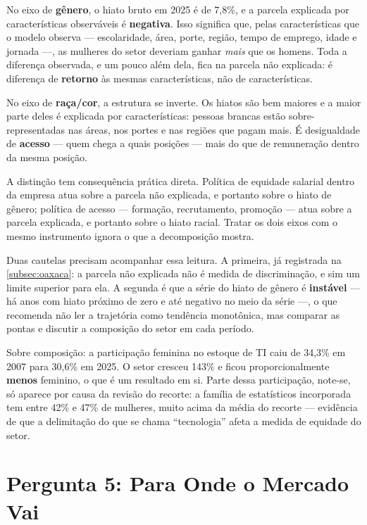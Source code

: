 No eixo de \textbf{gênero}, o hiato bruto em 2025 é de 7,8\%, e a parcela explicada por características observáveis é \textbf{negativa}. Isso significa que, pelas características que o modelo observa --- escolaridade, área, porte, região, tempo de emprego, idade e jornada ---, as mulheres do setor deveriam ganhar \textit{mais} que os homens. Toda a diferença observada, e um pouco além dela, fica na parcela não explicada: é diferença de \textbf{retorno} às mesmas características, não de características.

No eixo de \textbf{raça/cor}, a estrutura se inverte. Os hiatos são bem maiores e a maior parte deles é explicada por características: pessoas brancas estão sobre-representadas nas áreas, nos portes e nas regiões que pagam mais. É desigualdade de \textbf{acesso} --- quem chega a quais posições --- mais do que de remuneração dentro da mesma posição.

A distinção tem consequência prática direta. Política de equidade salarial dentro da empresa atua sobre a parcela não explicada, e portanto sobre o hiato de gênero; política de acesso --- formação, recrutamento, promoção --- atua sobre a parcela explicada, e portanto sobre o hiato racial. Tratar os dois eixos com o mesmo instrumento ignora o que a decomposição mostra.

Duas cautelas precisam acompanhar essa leitura. A primeira, já registrada na \autoref{subsec:oaxaca}: a parcela não explicada não é medida de discriminação, e sim um limite superior para ela. A segunda é que a série do hiato de gênero é \textbf{instável} --- há anos com hiato próximo de zero e até negativo no meio da série ---, o que recomenda não ler a trajetória como tendência monotônica, mas comparar as pontas e discutir a composição do setor em cada período.

Sobre composição: a participação feminina no estoque de TI caiu de 34,3\% em 2007 para 30,6\% em 2025. O setor cresceu 143\% e ficou proporcionalmente \textbf{menos} feminino, o que é um resultado em si. Parte dessa participação, note-se, só aparece por causa da revisão do recorte: a família de estatísticos incorporada tem entre 42\% e 47\% de mulheres, muito acima da média do recorte --- evidência de que a delimitação do que se chama ``tecnologia'' afeta a medida de equidade do setor.

\section{Pergunta 5: Para Onde o Mercado Vai}
\label{sec:resultado-q5}

